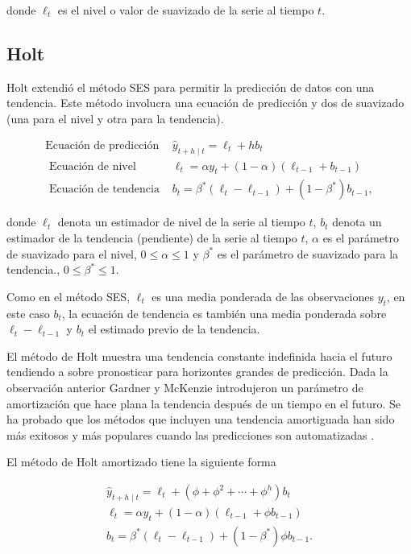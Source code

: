 donde $\ell_{t}$ es el nivel o valor de suavizado de la serie al tiempo $t$.  

\subsection{Holt}

Holt extendió el método SES para permitir la predicción de datos con una tendencia. Este método involucra una ecuación de predicción y dos de suavizado (una para el nivel y otra para la tendencia).

\begin{equation*}
	\begin{array}{lcl} 
		 \text {Ecuación de predicción} & \hat{y}_{t+h \mid t}=\ell_{t}+h b_{t} \\
		\text { Ecuación de nivel } & \ell_{t}=\alpha y_{t}+(1-\alpha)\left(\ell_{t-1}+b_{t-1}\right) \\
		\text { Ecuación de tendencia } & b_{t} =\beta^{*}\left(\ell_{t}-\ell_{t-1}\right)+\left(1-\beta^{*}\right) b_{t-1},
	\end{array} 
\end{equation*}

donde $\ell_{t}$ denota un estimador de nivel de la serie al tiempo $t$,  $b_{t}$ denota un estimador de la tendencia (pendiente) de la serie al tiempo $t$, $\alpha$ es el parámetro de suavizado para el nivel, $0 \leq \alpha \leq 1$ y $\beta^*$ es el parámetro de suavizado para la tendencia., $0 \leq \beta^* \leq 1$.

Como en el método SES, $\ell_{t}$ es una media ponderada de las observaciones $y_t$, en este caso $b_t$, la ecuación de tendencia es también una media ponderada sobre $\ell_{t}-\ell_{t-1}$ y $b_t$ el estimado previo de la tendencia. 

El método de Holt muestra una tendencia constante indefinida hacia el futuro tendiendo a sobre pronosticar para horizontes grandes de predicción. Dada la observación anterior Gardner y McKenzie introdujeron un parámetro de amortización que hace plana la tendencia después de un tiempo en el futuro. Se ha probado que los métodos que incluyen una tendencia amortiguada han sido más exitosos y más populares cuando las predicciones son automatizadas \cite{hyndmanForecastingPrinciplesPractice}. 

El método de Holt amortizado tiene la siguiente forma

\begin{equation*}
	\begin{array}{cl} 
	\hat{y}_{t+h \mid t} =\ell_{t}+\left(\phi+\phi^{2}+\cdots+\phi^{h}\right) b_{t} \\
	\ell_{t} =\alpha y_{t}+(1-\alpha)\left(\ell_{t-1}+\phi b_{t-1}\right) \\
	b_{t}=\beta^{*}\left(\ell_{t}-\ell_{t-1}\right)+\left(1-\beta^{*}\right) \phi b_{t-1} .
	\end{array} 
\end{equation*}

